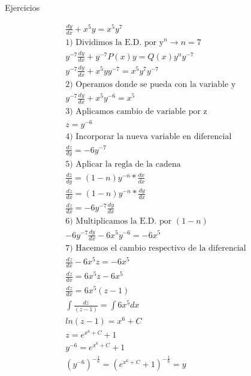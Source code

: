 \documentclass{article}
\begin{document}
Ejercicios


\begin{gather*}
\frac{dy}{dx}+x^{5}y = x^{5}y^{7} \\
1)\text{ Dividimos la E.D. por y}^{n}   \rightarrow  n =7 \\
y^{-7}\frac{dy}{dx} +y^{-7}P(x)y = Q(x)y^{n}y^{-7} \\
y^{-7}\frac{dy}{dx}+x^{5}yy^{-7} = x^{5}y^{7}y^{-7} \\
2)\text{ Operamos donde se pueda con la variable y} \\
y^{-7}\frac{dy}{dx}+x^{5}y^{-6} = x^{5} \\
3)\text{ Aplicamos cambio de variable por z} \\
z = y^{-6} \\
4)\text{ Incorporar la nueva variable en diferencial} \\
\frac{dz}{dy} =-6y^{-7}  \\
5)\text{ Aplicar la regla de la cadena} \\
\frac{dz}{dy} =(1-n)y^{-n}*\frac{dx}{dx} \\
\frac{dz}{dx} =(1-n)y^{-n}*\frac{dy}{dx} \\
\frac{dz}{dx} =-6y^{-7}\frac{dy}{dx} \\
6)\text{ Multiplicamos la E.D. por }(1-n) \\
-6y^{-7}\frac{dy}{dx}-6x^{5}y^{-6} = -6x^{5} \\
7)\text{ Hacemos el cambio respectivo de la diferencial} \\
\frac{dz}{dx}-6x^{5}z=-6x^{5} \\
\frac{dz}{dx}=6x^{5}z-6x^{5} \\
\frac{dz}{dx}=6x^{5}(z-1) \\
\int \frac{dz}{(z-1)}=\int 6x^{5}dx \\
ln(z-1)=x^{6}+C \\
z=e^{x^{6}+C}+1 \\
y^{-6} = e^{x^{6}+C}+1 \\
(y^{-6})^{-\frac{1}{6}} = (e^{x^{6}+C}+1)^{-\frac{1}{6}} = y
\end{gather*}
\end{document}
